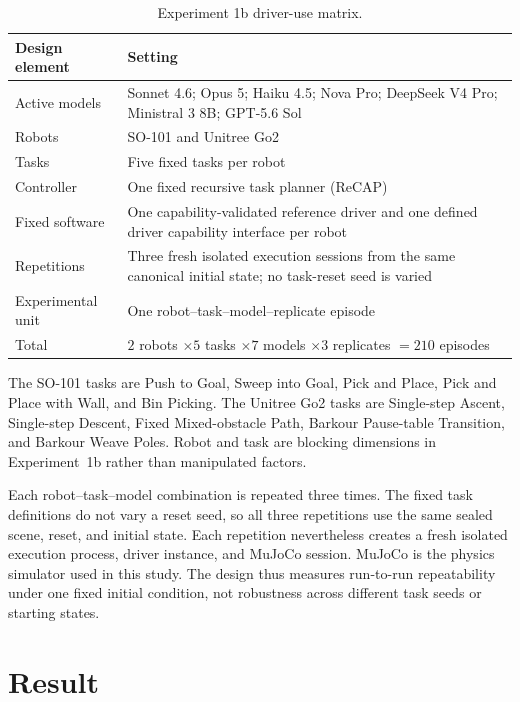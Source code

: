 \begin{table}[htbp]
  \centering
  \begingroup
  \small
  \renewcommand{\arraystretch}{1.12}
  \caption{Experiment 1b driver-use matrix.}
  \label{tab:chapter3-exp1b-matrix}
  \begin{tabularx}{\textwidth}{@{}>{\raggedright\arraybackslash}p{39mm}X@{}}
    \toprule
    \textbf{Design element} & \textbf{Setting} \\
    \midrule
    Active models & Sonnet 4.6; Opus 5; Haiku 4.5; Nova Pro; DeepSeek V4 Pro; Ministral 3 8B; GPT-5.6 Sol \\
    Robots & SO-101 and Unitree Go2 \\
    Tasks & Five fixed tasks per robot \\
    Controller & One fixed recursive task planner (ReCAP) \\
    Fixed software & One capability-validated reference driver and one defined driver capability interface per robot \\
    Repetitions & Three fresh isolated execution sessions from the same canonical initial state; no task-reset seed is varied \\
    Experimental unit & One robot--task--model--replicate episode \\
    Total & $2$ robots $\times 5$ tasks $\times 7$ models $\times 3$ replicates $=210$ episodes \\
    \bottomrule
  \end{tabularx}
  \endgroup
\end{table}

The SO-101 tasks are Push to Goal, Sweep into Goal, Pick and Place, Pick and
Place with Wall, and Bin Picking. The Unitree Go2 tasks are Single-step
Ascent, Single-step Descent, Fixed Mixed-obstacle Path, Barkour Pause-table
Transition, and Barkour Weave Poles. Robot and task are blocking dimensions in
Experiment~1b rather than manipulated factors.

Each robot--task--model combination is repeated three times. The fixed task
definitions do not vary a reset seed, so all three repetitions use the same
sealed scene, reset, and initial state. Each repetition nevertheless creates a
fresh isolated execution process, driver instance, and MuJoCo session. MuJoCo
is the physics simulator used in this study. The design thus measures
run-to-run repeatability under one fixed initial condition, not robustness
across different task seeds or starting states.

\section[Result]{Result}

